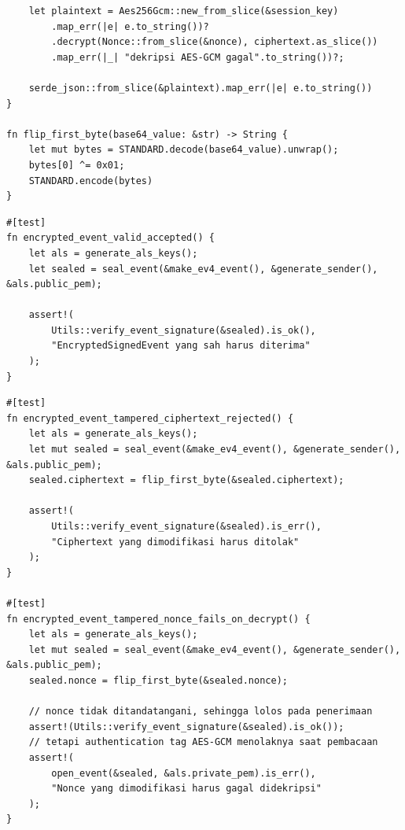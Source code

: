 \begin{listing}[ht]
\begin{verbatim}
    let plaintext = Aes256Gcm::new_from_slice(&session_key)
        .map_err(|e| e.to_string())?
        .decrypt(Nonce::from_slice(&nonce), ciphertext.as_slice())
        .map_err(|_| "dekripsi AES-GCM gagal".to_string())?;
 
    serde_json::from_slice(&plaintext).map_err(|e| e.to_string())
}
 
fn flip_first_byte(base64_value: &str) -> String {
    let mut bytes = STANDARD.decode(base64_value).unwrap();
    bytes[0] ^= 0x01;
    STANDARD.encode(bytes)
}
\end{verbatim}
\caption{Fungsi pembantu pembentukan dan pembukaan \texttt{EncryptedSignedEvent}}
\label{code:helper-encrypted-event}
\end{listing}
 
\begin{listing}[ht]
\begin{verbatim}
#[test]
fn encrypted_event_valid_accepted() {
    let als = generate_als_keys();
    let sealed = seal_event(&make_ev4_event(), &generate_sender(), &als.public_pem);
 
    assert!(
        Utils::verify_event_signature(&sealed).is_ok(),
        "EncryptedSignedEvent yang sah harus diterima"
    );
}
\end{verbatim}
\caption{Pengujian P-KNF-06: \texttt{EncryptedSignedEvent} sah diterima}
\label{code:p-knf-06}
\end{listing}
 
\begin{listing}[ht]
\begin{verbatim}
#[test]
fn encrypted_event_tampered_ciphertext_rejected() {
    let als = generate_als_keys();
    let mut sealed = seal_event(&make_ev4_event(), &generate_sender(), &als.public_pem);
    sealed.ciphertext = flip_first_byte(&sealed.ciphertext);
 
    assert!(
        Utils::verify_event_signature(&sealed).is_err(),
        "Ciphertext yang dimodifikasi harus ditolak"
    );
}
 
#[test]
fn encrypted_event_tampered_nonce_fails_on_decrypt() {
    let als = generate_als_keys();
    let mut sealed = seal_event(&make_ev4_event(), &generate_sender(), &als.public_pem);
    sealed.nonce = flip_first_byte(&sealed.nonce);
 
    // nonce tidak ditandatangani, sehingga lolos pada penerimaan
    assert!(Utils::verify_event_signature(&sealed).is_ok());
    // tetapi authentication tag AES-GCM menolaknya saat pembacaan
    assert!(
        open_event(&sealed, &als.private_pem).is_err(),
        "Nonce yang dimodifikasi harus gagal didekripsi"
    );
}
\end{verbatim}
\caption{Pengujian P-KNF-07: integritas \textit{ciphertext} dan \textit{nonce}}
\label{code:p-knf-07}
\end{listing}
 
